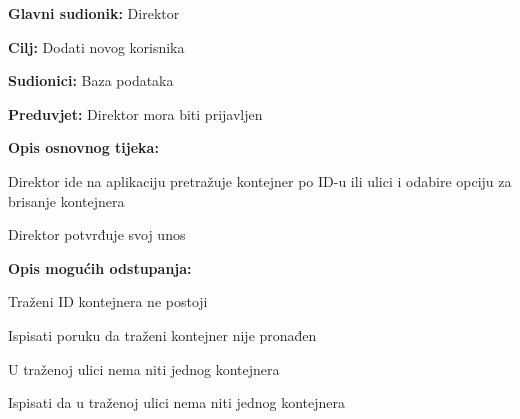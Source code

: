 			\noindent {}
			\begin{packed_item}
				
				\item \textbf{Glavni sudionik: } Direktor
				\item  \textbf{Cilj:} Dodati novog korisnika
				\item  \textbf{Sudionici:} Baza podataka
				\item  \textbf{Preduvjet:} Direktor mora biti prijavljen
				\item  \textbf{Opis osnovnog tijeka:}
				
				\item[] \begin{packed_enum}
					
					\item Direktor ide na aplikaciju pretražuje kontejner po ID-u ili ulici i odabire opciju za brisanje kontejnera
					\item Direktor potvrđuje svoj unos
				\end{packed_enum}
				
				\item  \textbf{Opis mogućih odstupanja:}
				
				\item[] \begin{packed_item}
					
					\item[2.a] Traženi ID kontejnera ne postoji
					\item[] \begin{packed_enum}
						
						\item Ispisati poruku da traženi kontejner nije pronađen
						
					\end{packed_enum}
					\item[2.b] U traženoj ulici nema niti jednog kontejnera
					\item[] \begin{packed_enum}
						
						\item Ispisati da u traženoj ulici nema niti jednog kontejnera
						
					\end{packed_enum}
					
				\end{packed_item}
			\end{packed_item}
			
